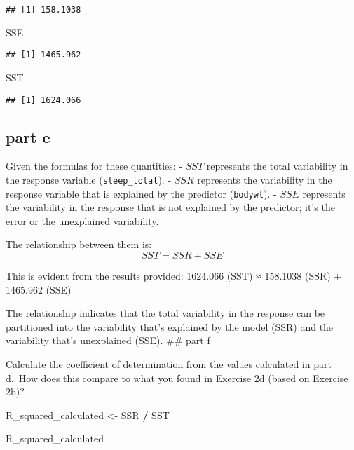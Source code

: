 \documentclass[
]{article}
\newenvironment{Shaded}{\begin{snugshade}}{\end{snugshade}}
\newcommand{\NormalTok}[1]{#1}
\newcommand{\OtherTok}[1]{\textcolor[rgb]{0.56,0.35,0.01}{#1}}
\newcommand{\SpecialCharTok}[1]{\textcolor[rgb]{0.81,0.36,0.00}{\textbf{#1}}}
\begin{document}
\begin{verbatim}
## [1] 158.1038
\end{verbatim}

\begin{Shaded}
\begin{Highlighting}[]
\NormalTok{SSE}
\end{Highlighting}
\end{Shaded}

\begin{verbatim}
## [1] 1465.962
\end{verbatim}

\begin{Shaded}
\begin{Highlighting}[]
\NormalTok{SST}
\end{Highlighting}
\end{Shaded}

\begin{verbatim}
## [1] 1624.066
\end{verbatim}

\subsection{part e}\label{part-e-1}

Given the formulas for these quantities: - \(SST\) represents the total
variability in the response variable (\texttt{sleep\_total}). - \(SSR\)
represents the variability in the response variable that is explained by
the predictor (\texttt{bodywt}). - \(SSE\) represents the variability in
the response that is not explained by the predictor; it's the error or
the unexplained variability.

The relationship between them is: \[ SST = SSR + SSE \]

This is evident from the results provided: 1624.066 (SST) ≈ 158.1038
(SSR) + 1465.962 (SSE)

The relationship indicates that the total variability in the response
can be partitioned into the variability that's explained by the model
(SSR) and the variability that's unexplained (SSE). \#\# part f

Calculate the coefficient of determination from the values calculated in
part d.~How does this compare to what you found in Exercise 2d (based on
Exercise 2b)?

\begin{Shaded}
\begin{Highlighting}[]
\NormalTok{R\_squared\_calculated }\OtherTok{\textless{}{-}}\NormalTok{ SSR }\SpecialCharTok{/}\NormalTok{ SST}

\NormalTok{R\_squared\_calculated}
\end{Highlighting}
\end{Shaded}
\end{document}
